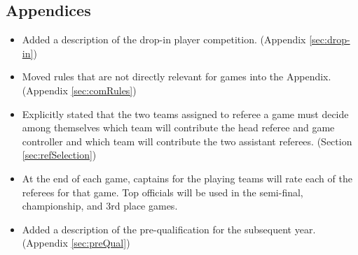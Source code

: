 \documentclass[12pt]{article}
\begin{document}
\subsection*{Appendices}
\begin{itemize}	
	\item Added a description of the drop-in player competition. (Appendix \ref{sec:drop-in})
	\item Moved rules that are not directly relevant for games into the Appendix. (Appendix \ref{sec:comRules})
	\item Explicitly stated that the two teams assigned to referee a game must decide among themselves which team will contribute the head referee and game controller and which team will contribute the two assistant referees. (Section \ref{sec:refSelection})
	\item At the end of each game, captains for the playing teams will rate each of the referees for that game.  Top officials will be used in the semi-final, championship, and 3rd place games.
	\item Added a description of the pre-qualification for the subsequent year. (Appendix \ref{sec:preQual})
\end{itemize}
\end{document}

